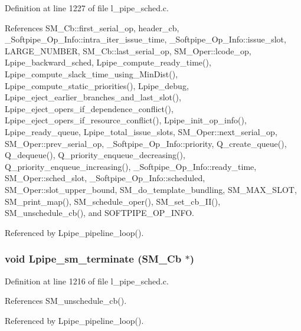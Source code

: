 Definition at line 1227 of file l\_\-pipe\_\-sched.c.

References SM\_\-Cb::first\_\-serial\_\-op, header\_\-cb, \_\-Softpipe\_\-Op\_\-Info::intra\_\-iter\_\-issue\_\-time, \_\-Softpipe\_\-Op\_\-Info::issue\_\-slot, LARGE\_\-NUMBER, SM\_\-Cb::last\_\-serial\_\-op, SM\_\-Oper::lcode\_\-op, Lpipe\_\-backward\_\-sched, Lpipe\_\-compute\_\-ready\_\-time(), Lpipe\_\-compute\_\-slack\_\-time\_\-using\_\-Min\-Dist(), Lpipe\_\-compute\_\-static\_\-priorities(), Lpipe\_\-debug, Lpipe\_\-eject\_\-earlier\_\-branches\_\-and\_\-last\_\-slot(), Lpipe\_\-eject\_\-opers\_\-if\_\-dependence\_\-conflict(), Lpipe\_\-eject\_\-opers\_\-if\_\-resource\_\-conflict(), Lpipe\_\-init\_\-op\_\-info(), Lpipe\_\-ready\_\-queue, Lpipe\_\-total\_\-issue\_\-slots, SM\_\-Oper::next\_\-serial\_\-op, SM\_\-Oper::prev\_\-serial\_\-op, \_\-Softpipe\_\-Op\_\-Info::priority, Q\_\-create\_\-queue(), Q\_\-dequeue(), Q\_\-priority\_\-enqueue\_\-decreasing(), Q\_\-priority\_\-enqueue\_\-increasing(), \_\-Softpipe\_\-Op\_\-Info::ready\_\-time, SM\_\-Oper::sched\_\-slot, \_\-Softpipe\_\-Op\_\-Info::scheduled, SM\_\-Oper::slot\_\-upper\_\-bound, SM\_\-do\_\-template\_\-bundling, SM\_\-MAX\_\-SLOT, SM\_\-print\_\-map(), SM\_\-schedule\_\-oper(), SM\_\-set\_\-cb\_\-II(), SM\_\-unschedule\_\-cb(), and SOFTPIPE\_\-OP\_\-INFO.

Referenced by Lpipe\_\-pipeline\_\-loop().
\subsubsection{\setlength{\rightskip}{0pt plus 5cm}void Lpipe\_\-sm\_\-terminate (\bf{SM\_\-Cb} $\ast$)}\label{l__pipe__sched_8h_c15a13771ee9ba2bcc09154f1dbed4f3}




Definition at line 1216 of file l\_\-pipe\_\-sched.c.

References SM\_\-unschedule\_\-cb().

Referenced by Lpipe\_\-pipeline\_\-loop().